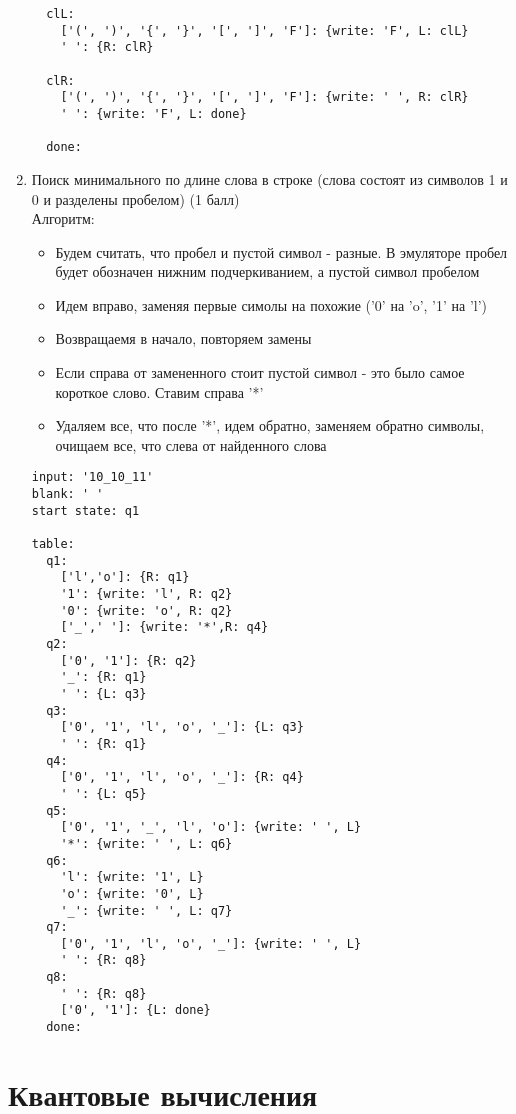 \documentclass[a4paper]{article}
\begin{document}
\begin{enumerate}
\begin{verbatim}
  clL:
    ['(', ')', '{', '}', '[', ']', 'F']: {write: 'F', L: clL}
    ' ': {R: clR}
  
  clR:
    ['(', ')', '{', '}', '[', ']', 'F']: {write: ' ', R: clR}
    ' ': {write: 'F', L: done}
  
  done:
\end{verbatim}



    \item Поиск минимального по длине слова в строке (слова состоят из символов 1 и 0 и разделены пробелом) (1 балл) \\
		Алгоритм:
		\begin{itemize}
			\item Будем считать, что пробел и пустой символ - разные. В эмуляторе пробел будет обозначен нижним подчеркиванием, а пустой символ пробелом
			\item Идем вправо, заменяя первые симолы на похожие ('0' на 'o', '1' на 'l')
			\item Возвращаемя в начало, повторяем замены
			\item Если справа от замененного стоит пустой символ - это было самое короткое слово. Ставим справа '*'
			\item Удаляем все, что после '*', идем обратно, заменяем обратно символы, очищаем все, что слева от найденного слова 
		\end{itemize}
\begin{verbatim}
input: '10_10_11'
blank: ' '
start state: q1
  
table:
  q1:
    ['l','o']: {R: q1}
    '1': {write: 'l', R: q2}
    '0': {write: 'o', R: q2}
    ['_',' ']: {write: '*',R: q4}  
  q2:
    ['0', '1']: {R: q2}
    '_': {R: q1}
    ' ': {L: q3}
  q3:
    ['0', '1', 'l', 'o', '_']: {L: q3}
    ' ': {R: q1}
  q4:
    ['0', '1', 'l', 'o', '_']: {R: q4}
    ' ': {L: q5}
  q5:
    ['0', '1', '_', 'l', 'o']: {write: ' ', L}
    '*': {write: ' ', L: q6}
  q6:
    'l': {write: '1', L}
    'o': {write: '0', L}
    '_': {write: ' ', L: q7}
  q7:
    ['0', '1', 'l', 'o', '_']: {write: ' ', L}
    ' ': {R: q8}
  q8:
    ' ': {R: q8}
    ['0', '1']: {L: done}
  done:
\end{verbatim}

\end{enumerate}




\section{Квантовые вычисления}
\end{document}
